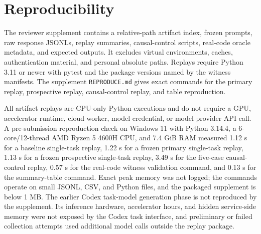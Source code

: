 \section{Reproducibility}

The reviewer supplement contains a relative-path artifact index, frozen prompts, raw response JSONLs, replay summaries, causal-control scripts, real-code oracle metadata, and expected outputs. It excludes virtual environments, caches, authentication material, and personal absolute paths. Replays require Python 3.11 or newer with pytest and the package versions named by the witness manifests. The supplement \texttt{REPRODUCE.md} gives exact commands for the primary replay, prospective replay, causal-control replay, and table reproduction.

All artifact replays are CPU-only Python executions and do not require a GPU, accelerator runtime, cloud worker, model credential, or model-provider API call. A pre-submission reproduction check on Windows 11 with Python 3.14.4, a 6-core/12-thread AMD Ryzen 5 4600H CPU, and 7.4 GiB RAM measured 1.12 s for a baseline single-task replay, 1.22 s for a frozen primary single-task replay, 1.13 s for a frozen prospective single-task replay, 3.49 s for the five-case causal-control replay, 0.57 s for the real-code witness validation command, and 0.13 s for the summary-table command. Exact peak memory was not logged; the commands operate on small JSONL, CSV, and Python files, and the packaged supplement is below 1 MB. The earlier Codex task-model generation phase is not reproduced by the supplement. Its inference hardware, accelerator hours, and hidden service-side memory were not exposed by the Codex task interface, and preliminary or failed collection attempts used additional model calls outside the replay package.
